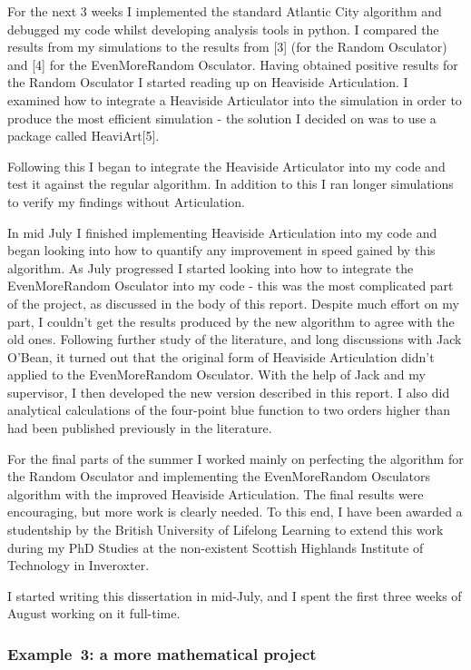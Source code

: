 \documentclass[12pt,a4paper]{report}
\begin{document}
For the next 3 weeks I implemented the standard Atlantic City
algorithm and debugged my code whilst developing analysis tools in
python. I compared the results from my simulations to the results from
[3] (for the Random Osculator) and [4] for the EvenMoreRandom
Osculator. Having obtained positive results for the Random Osculator I
started reading up on Heaviside Articulation. I examined how to
integrate a Heaviside Articulator into the simulation in order to
produce the most efficient simulation - the solution I decided on was
to use a package called HeaviArt[5].

Following this I began to integrate the Heaviside Articulator into my
code and test it against the regular algorithm. In addition to this I
ran longer simulations to verify my findings without Articulation.

In mid July I finished implementing Heaviside Articulation into my
code and began looking into how to quantify any improvement in speed
gained by this algorithm. As July progressed I started looking into
how to integrate the EvenMoreRandom Osculator into my code - this was
the most complicated part of the project, as discussed in the body of
this report. Despite much effort on my part, I couldn't get the
results produced by the new algorithm to agree with the old
ones. Following further study of the literature, and long discussions
with Jack O'Bean, it turned out that the original form of Heaviside
Articulation didn't applied to the EvenMoreRandom Osculator. With the
help of Jack and my supervisor, I then developed the new version
described in this report. I also did analytical calculations of the
four-point blue function to two orders higher than had
been published previously in the literature.

For the final parts of the summer I worked mainly on perfecting the
algorithm for the Random Osculator and implementing the EvenMoreRandom
Osculators algorithm with the improved Heaviside Articulation. The
final results were encouraging, but more work is clearly needed. To
this end, I have been awarded a studentship by the British University
of Lifelong Learning to extend this work during my PhD Studies at
the non-existent Scottish Highlands Institute of Technology in
Inveroxter.

I started writing this dissertation in mid-July, and I spent the first
three weeks of August working on it full-time.


\subsubsection{Example~3: a more mathematical project}
\end{document}
